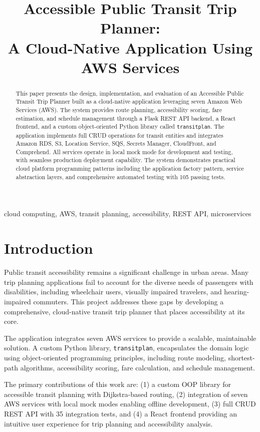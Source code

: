 \documentclass[conference]{IEEEtran}
\title{Accessible Public Transit Trip Planner:\\A Cloud-Native Application Using AWS Services}
\author{
\IEEEauthorblockN{Rakesh Kunchala}
\IEEEauthorblockA{Student ID: x25176862\\
x25176862@student.ncirl.ie\\
National College of Ireland\\
Cloud Platform Programming}
}
\begin{document}
\maketitle

\begin{abstract}
This paper presents the design, implementation, and evaluation of an Accessible Public Transit Trip Planner built as a cloud-native application leveraging seven Amazon Web Services (AWS). The system provides route planning, accessibility scoring, fare estimation, and schedule management through a Flask REST API backend, a React frontend, and a custom object-oriented Python library called \texttt{transitplan}. The application implements full CRUD operations for transit entities and integrates Amazon RDS, S3, Location Service, SQS, Secrets Manager, CloudFront, and Comprehend. All services operate in local mock mode for development and testing, with seamless production deployment capability. The system demonstrates practical cloud platform programming patterns including the application factory pattern, service abstraction layers, and comprehensive automated testing with 105 passing tests.
\end{abstract}

\begin{IEEEkeywords}
cloud computing, AWS, transit planning, accessibility, REST API, microservices
\end{IEEEkeywords}

\section{Introduction}

Public transit accessibility remains a significant challenge in urban areas. Many trip planning applications fail to account for the diverse needs of passengers with disabilities, including wheelchair users, visually impaired travelers, and hearing-impaired commuters. This project addresses these gaps by developing a comprehensive, cloud-native transit trip planner that places accessibility at its core.

The application integrates seven AWS services to provide a scalable, maintainable solution. A custom Python library, \texttt{transitplan}, encapsulates the domain logic using object-oriented programming principles, including route modeling, shortest-path algorithms, accessibility scoring, fare calculation, and schedule management.

The primary contributions of this work are: (1) a custom OOP library for accessible transit planning with Dijkstra-based routing, (2) integration of seven AWS services with local mock modes enabling offline development, (3) full CRUD REST API with 35 integration tests, and (4) a React frontend providing an intuitive user experience for trip planning and accessibility analysis.
\end{document}
